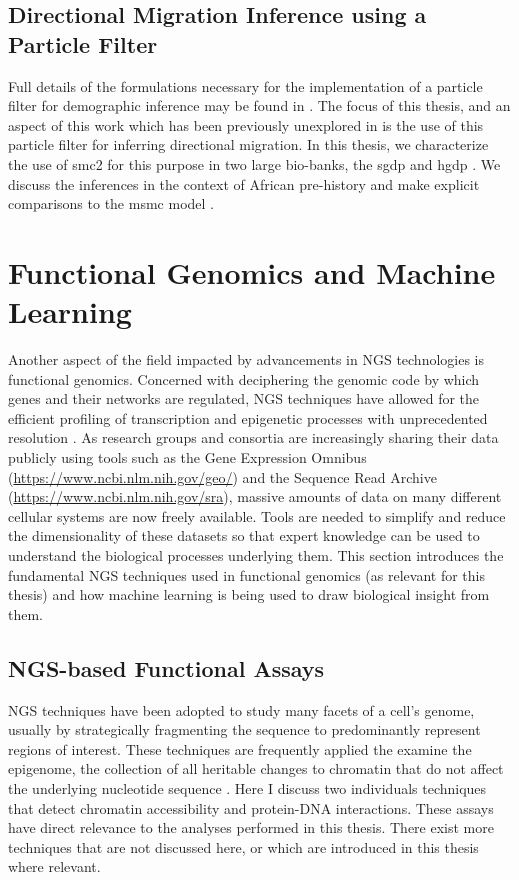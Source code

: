 \subsection{Directional Migration Inference using a Particle Filter}

Full details of the formulations necessary for the implementation of a particle filter for demographic inference may be found in \cite{10.1371/journal.pone.0247647}. The focus of this thesis, and an aspect of this work which has been previously unexplored in \cite{10.1371/journal.pone.0247647} is the use of this particle filter for inferring directional migration. In this thesis, we characterize the use of \gls{smc2} for this purpose in two large bio-banks, the \gls{sgdp} and \gls{hgdp} \cite{Mallick2016, Bergstrom2019}. We discuss the inferences in the context of African pre-history and make explicit comparisons to the \gls{msmc} model \cite{Schiffels2014}. 

\section{Functional Genomics and Machine Learning} \label{intro:fungen}

Another aspect of the field impacted by advancements in NGS technologies is functional genomics. Concerned with deciphering the genomic code by which genes and their networks are regulated, NGS techniques have allowed for the efficient profiling of transcription and epigenetic processes with unprecedented resolution \cite{Morozova2008,Cullum2011,Morozova2008a,Hurd2009,T2010}. As research groups and consortia are increasingly sharing their data publicly using tools such as the Gene Expression Omnibus (\url{https://www.ncbi.nlm.nih.gov/geo/}) and the Sequence Read Archive (\url{https://www.ncbi.nlm.nih.gov/sra}), massive amounts of data on many different cellular systems are now freely available. Tools are needed to simplify and reduce the dimensionality of these datasets so that expert knowledge can be used to understand the biological processes underlying them. This section introduces the fundamental NGS techniques used in functional genomics (as relevant for this thesis) and how machine learning is being used to draw biological insight from them.

\subsection{NGS-based Functional Assays}

NGS techniques have been adopted to study many facets of a cell's genome, usually by strategically fragmenting the sequence to predominantly represent regions of interest. These techniques are frequently applied the examine the epigenome, the collection of all heritable changes to chromatin that do not affect the underlying nucleotide sequence \cite{Allis2016}.   Here I discuss two individuals techniques that detect chromatin accessibility and protein-DNA interactions.  These assays have direct relevance to the analyses performed in this thesis. There exist more techniques that are not discussed here, or which are introduced in this thesis where relevant. 

